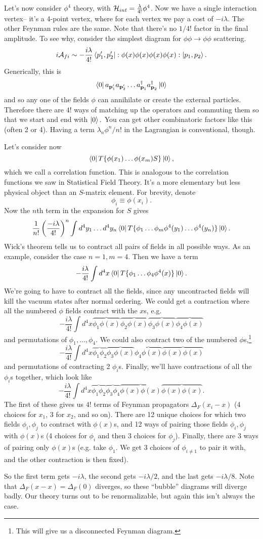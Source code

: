 Let's now consider $\phi^4$ theory, with $\mathcal H_{int}=\frac{\lambda}{4!} \phi^4$. Now we have a single interaction vertex-- it's a 4-point vertex, where for each vertex we pay a cost of $-i\lambda$. The other Feynman rules are the same. Note that there's no $1/4!$ factor in the final amplitude. To see why, consider the simplest diagram for $\phi\phi\to \phi \phi$ scattering.
$$i\mathcal{A}_{fi}\sim -\frac{i\lambda}{4!}\left< p_1',p_2' \right|:\phi(x)\phi(x)\phi(x)\phi(x):\left| p_1,p_2 \right>.$$ Generically, this is
$$\left< 0 \right|a_{\boldsymbol{\mathbf{p}}_1'}a_{\boldsymbol{\mathbf{p}}_2'}\ldots a_{\boldsymbol{\mathbf{p}}_1}^\dagger a_{\boldsymbol{\mathbf{p}}_2}^\dagger \left| 0 \right>$$
and so any one of the fields $\phi$ can annihilate or create the external particles. Therefore there are $4!$ ways of matching up the operators and commuting them so that we start and end with $\left| 0 \right>.$  You can get other combinatoric factors like this (often 2 or 4). Having a term $\lambda_n \phi^n/n!$ in the Lagrangian is conventional, though.

Let's consider now
$$\left< 0 \right|T\{\phi(x_1)\ldots \phi(x_m) S\}\left| 0 \right>,$$ which we call a correlation function. This is analogous to the correlation functions we saw in Statistical Field Theory. It's a more elementary but less physical object than an $S$-matrix element. For brevity, denote
$$\phi_i \equiv \phi(x_i).$$ Now the $n$th term in the expansion for $S$ gives
$$\frac{1}{n!}\left(\frac{-i\lambda}{4!}\right)^n\int d^4 y_1 \ldots d^4 y_n \left< 0 \right| T\{\phi_1 \ldots \phi_m \phi^4(y_1)\ldots \phi^4(y_n)\}\left| 0 \right>.$$
Wick's theorem tells us to contract all pairs of fields in all possible ways. As an example, consider the case $n=1,m=4$.
Then we have a term
$$-\frac{i\lambda}{4!}\int d^4x \left< 0 \right|T\{\phi_1 \ldots \phi_4 \phi^4(x)\}\left| 0 \right>.$$
We're going to have to contract all the fields, since any uncontracted fields will kill the vacuum states after normal ordering. We could get a contraction where all the numbered $\phi$ fields contract with the $x$s, e.g.
$$-\frac{i\lambda}{4!}\int d^4 x \overbrace{\phi_1 \phi(x)}\overbrace{\phi_2 \phi(x)} \overbrace{\phi_3\phi(x)}\overbrace{\phi_4\phi(x)}$$
and permutations of $\phi_1,\ldots,\phi_4.$ We could also contract two of the numbered $\phi$s,\footnote{This will give us a disconnected Feynman diagram.}
$$-\frac{i\lambda}{4!} \int d^4x \overbrace{\phi_1 \phi_2} \overbrace{\phi_3 \phi(x)} \overbrace{\phi_4 \phi(x)} \overbrace{\phi(x)\phi(x)}$$
and permutations of contracting 2 $\phi_i$s. Finally, we'll have contractions of all the $\phi_i$s together, which look like
$$-\frac{i\lambda}{4!}\int d^4x \overbrace{\phi_1\phi_2} \overbrace{\phi_3\phi_4} \overbrace{\phi(x)\phi(x)}\overbrace{\phi(x)\phi(x)}.$$
The first of these gives us $4!$ terms of Feynman propagators $\Delta_F (x_i-x)$ (4 choices for $x_1$, $3$ for $x_2$, and so on). There are 12 unique choices for which two fields $\phi_i,\phi_j$ to contract with $\phi(x)$s, and 12 ways of pairing those fields $\phi_i,\phi_j$ with $\phi(x)$s (4 choices for $\phi_i$ and then $3$ choices for $\phi_j$). Finally, there are $3$ ways of pairing only $\phi(x)$s (e.g. take $\phi_1$. We get 3 choices of $\phi_{i\neq 1}$ to pair it with, and the other contraction is then fixed).

So the first term gets $-i\lambda$, the second gets $-i\lambda/2$, and the last gets $-i\lambda/8$. Note that $\Delta_F(x-x)=\Delta_F(0)$ diverges, so these ``bubble'' diagrams will diverge badly. Our theory turns out to be renormalizable, but again this isn't always the case.